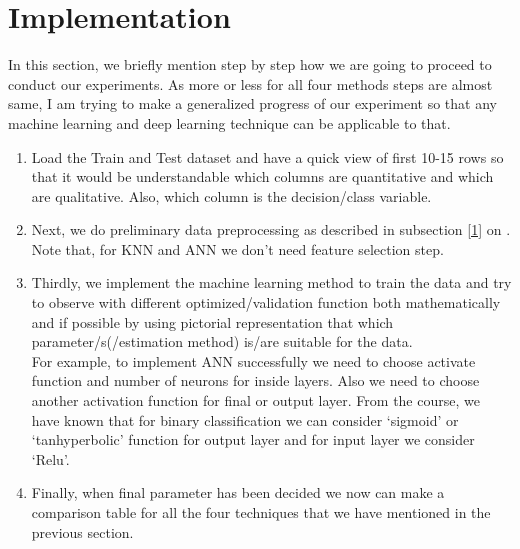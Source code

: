 \documentclass{llncs}
\begin{document}
\section{Implementation}
In this section, we briefly mention step by step how we are going to proceed to conduct our experiments. As more or less for all four methods steps are almost same, I am trying to make a generalized progress of our experiment so that any machine learning and deep learning technique can be applicable to that.
\begin{enumerate}
\item Load the Train and Test dataset and have a quick view of first 10-15 rows so that it would be understandable which columns are quantitative and which are qualitative. Also, which column is the decision/class variable.
\item Next, we do preliminary data preprocessing as described in subsection \ref{1} on \pageref{1}. Note that, for KNN and ANN we don't need feature selection step.
\item Thirdly, we implement the machine learning method to train the data and try to observe with different optimized/validation function both mathematically and if possible by using pictorial representation that which parameter/s(/estimation method) is/are suitable for the data. \\For example, to implement ANN successfully we need to choose activate function and number of neurons for inside layers. Also we need to choose another activation function for final or output layer.
From the course, we have known that for binary classification we can consider `sigmoid' or `tanhyperbolic' function for output layer and for input layer we consider `Relu'.   
\item Finally, when final parameter has been decided we now can make a comparison table for all the four techniques that we have mentioned in the previous section. 
\end{enumerate}
\vspace{-0.6cm}
\end{document}
